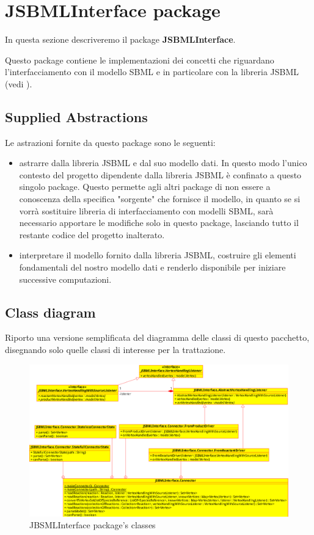 
\section{JSBMLInterface package}

In questa sezione descriveremo il package \textbf{JSBMLInterface}.

Questo package contiene le implementazioni dei concetti che riguardano
l'interfacciamento con il modello SBML e in particolare con la
libreria JSBML (vedi \cite{JSbmlDistribution}). 

\subsection{Supplied Abstractions}

Le astrazioni fornite da questo package sono le seguenti:
\begin{itemize}
\item astrarre dalla libreria JSBML e dal suo modello dati. In questo
  modo l'unico contesto del progetto dipendente dalla libreria JSBML
  \`e confinato a questo singolo package. Questo permette agli altri
  package di non essere a conoscenza della specifica "sorgente" che
  fornisce il modello, in quanto se si vorr\`a sostituire libreria di
  interfacciamento con modelli SBML, sar\`a necessario apportare le
  modifiche solo in questo package, lasciando tutto il restante codice
  del progetto inalterato.
\item interpretare il modello fornito dalla libreria JSBML, costruire
  gli elementi fondamentali del nostro modello dati e renderlo
  disponibile per iniziare successive computazioni.
\end{itemize}

\subsection{Class diagram}

Riporto una versione semplificata del diagramma delle classi di questo
pacchetto, disegnando solo quelle classi di interesse per la
trattazione.
\begin{figure}
  \centering
  \includegraphics[angle=90]{packages/JSBMLInterface-class-diagram.eps}
  \caption{JBSMLInterface package's classes}
  \label{fig:JSBMLInterface-ClassDiagram}
\end{figure}

